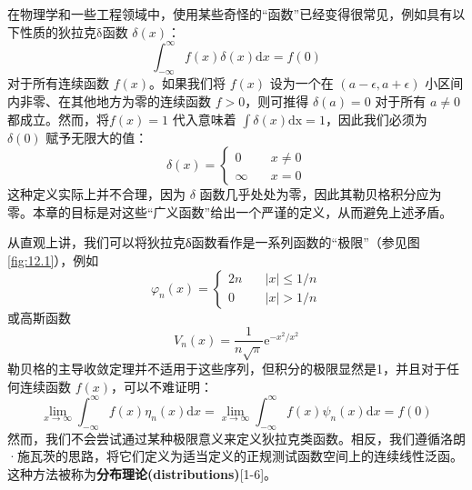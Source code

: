 在物理学和一些工程领域中，使用某些奇怪的“函数”已经变得很常见，例如具有以下性质的狄拉克$\mathrm{\delta}$函数
$\delta(x)$：
 $$
\int_{-\infty}^{\infty} f(x) \delta(x) \mathrm{d} x=f(0)
$$
对于所有连续函数 $f(x)$。如果我们将 $f(x)$ 设为一个在
$(a-\epsilon, a+\epsilon)$ 小区间内非零、在其他地方为零的连续函数
$f > 0$，则可推得 $\delta(a) = 0$ 对于所有 $a \neq 0$都成立。然而，将$f(x)=1$ 代入意味着 $\int \delta(x) \mathrm{dx}=1$，因此我们必须为
$\delta(0)$ 赋予无限大的值：
 $$
\delta(x)= \begin{cases}0 & \quad x \neq 0 \\ \infty & \quad x=0\end{cases}
$$
这种定义实际上并不合理，因为 $\delta$
函数几乎处处为零，因此其勒贝格积分应为零。本章的目标是对这些``广义函数''给出一个严谨的定义，从而避免上述矛盾。

从直观上讲，我们可以将狄拉克δ函数看作是一系列函数的``极限''（参见图\ref{fig:12.1}），例如
\begin{equation}
  \varphi_n(x)= \begin{cases}2 n & \quad|x| \leq 1 / n \\ 0 & \quad|x|>1 / n\end{cases}
\end{equation}
或高斯函数
 $$
V_n(x)=\frac{1}{n \sqrt{\pi}} \mathrm{e}^{-x^2 / x^2}
$$
勒贝格的主导收敛定理并不适用于这些序列，但积分的极限显然是1，并且对于任何连续函数
$f(x)$，可以不难证明：
 $$
\lim _{x \rightarrow \infty} \int_{-\infty}^{\infty} f(x) \eta_n(x) \mathrm{d} x=\lim _{x \rightarrow \infty} \int_{-\infty}^{\infty} f(x) \psi_n(x) \mathrm{d} x=f(0)
$$
然而，我们不会尝试通过某种极限意义来定义狄拉克类函数。相反，我们遵循洛朗·施瓦茨的思路，将它们定义为适当定义的正规测试函数空间上的连续线性泛函。这种方法被称为\textbf{分布理论(distributions)}{[}1-6{]}。
